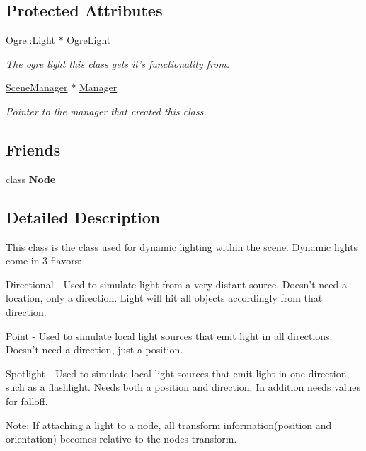 \subsection*{Protected Attributes}
\begin{DoxyCompactItemize}
\item 
\hypertarget{classphys_1_1Light_a20fc9136847907955cfb8c1a47d6ec6a}{
Ogre::Light $\ast$ \hyperlink{classphys_1_1Light_a20fc9136847907955cfb8c1a47d6ec6a}{OgreLight}}
\label{dc/df1/classphys_1_1Light_a20fc9136847907955cfb8c1a47d6ec6a}

\begin{DoxyCompactList}\small\item\em The ogre light this class gets it's functionality from. \item\end{DoxyCompactList}\item 
\hypertarget{classphys_1_1Light_a2633fc1795d2a3e2ddddc71674a7eb84}{
\hyperlink{classphys_1_1SceneManager}{SceneManager} $\ast$ \hyperlink{classphys_1_1Light_a2633fc1795d2a3e2ddddc71674a7eb84}{Manager}}
\label{dc/df1/classphys_1_1Light_a2633fc1795d2a3e2ddddc71674a7eb84}

\begin{DoxyCompactList}\small\item\em Pointer to the manager that created this class. \item\end{DoxyCompactList}\end{DoxyCompactItemize}
\subsection*{Friends}
\begin{DoxyCompactItemize}
\item 
\hypertarget{classphys_1_1Light_a6db9d28bd448a131448276ee03de1e6d}{
class {\bfseries Node}}
\label{dc/df1/classphys_1_1Light_a6db9d28bd448a131448276ee03de1e6d}

\end{DoxyCompactItemize}


\subsection{Detailed Description}
This class is the class used for dynamic lighting within the scene. Dynamic lights come in 3 flavors: \par
 Directional -\/ Used to simulate light from a very distant source. Doesn't need a location, only a direction. \hyperlink{classphys_1_1Light}{Light} will hit all objects accordingly from that direction. \par
 Point -\/ Used to simulate local light sources that emit light in all directions. Doesn't need a direction, just a position. \par
 Spotlight -\/ Used to simulate local light sources that emit light in one direction, such as a flashlight. Needs both a position and direction. In addition needs values for falloff. \par
 Note: If attaching a light to a node, all transform information(position and orientation) becomes relative to the nodes transform. 

